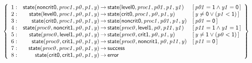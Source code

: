 \documentclass[a4paper]{article}
\def\lthtmlcheckvsize{\ifdim\ht\sizebox<\vsize 
  \ifdim\wd\sizebox<\hsize\expandafter\hfill\fi \expandafter\vfill
  \else\expandafter\vss\fi}%
\begin{document}
{\newpage\clearpage
{}%
$\displaystyle \left\{
\begin{array}{rr@{\>}c@{\>}ll}
\mathrm{1} : 
 & \mathsf{state}(\mathsf{noncrit0},\mathit{proc1},\mathit{p0},\mathit{p1},\mathit{y})
 & \to 
 & \mathsf{state}(\mathsf{level0},\mathit{proc1},\mathit{p01},\mathit{p1},\mathit{y1})
 & [\, \mathit{p01} = \mathsf{1} \land \mathit{y1} = \mathsf{0} \,]\\
\par
\mathrm{2} : 
 & \mathsf{state}(\mathsf{level0},\mathit{proc1},\mathit{p0},\mathit{p1},\mathit{y})
 & \to 
 & \mathsf{state}(\mathsf{crit0},\mathit{proc1},\mathit{p0},\mathit{p1},\mathit{y})
 & [\, \mathit{y} \ne \mathsf{0} \lor (\mathit{p1} < \mathsf{1}) \,]\\
\par
\mathrm{3} : 
 & \mathsf{state}(\mathsf{crit0},\mathit{proc1},\mathit{p0},\mathit{p1},\mathit{y})
 & \to 
 & \mathsf{state}(\mathsf{noncrit0},\mathit{proc1},\mathit{p01},\mathit{p1},\mathit{y})
 & [\, \mathit{p01} = \mathsf{0} \,]\\
\par
\mathrm{4} : 
 & \mathsf{state}(\mathit{proc0},\mathsf{noncrit1},\mathit{p0},\mathit{p1},\mathit{y})
 & \to 
 & \mathsf{state}(\mathit{proc0},\mathsf{level1},\mathit{p0},\mathit{p11},\mathit{y1})
 & [\, \mathit{p11} = \mathsf{1} \land \mathit{y1} = \mathsf{1} \,]\\
\par
\mathrm{5} : 
 & \mathsf{state}(\mathit{proc0},\mathsf{level1},\mathit{p0},\mathit{p1},\mathit{y})
 & \to 
 & \mathsf{state}(\mathit{proc0},\mathsf{crit1},\mathit{p0},\mathit{p1},\mathit{y})
 & [\, \mathit{y} \ne \mathsf{1} \lor (\mathit{p0} < \mathsf{1}) \,]\\
\par
\mathrm{6} : 
 & \mathsf{state}(\mathit{proc0},\mathsf{crit1},\mathit{p0},\mathit{p1},\mathit{y})
 & \to 
 & \mathsf{state}(\mathit{proc0},\mathsf{noncrit1},\mathit{p0},\mathit{p11},\mathit{y})
 & [\, \mathit{p11} = \mathsf{0} \,]\\
\par
\mathrm{7} : 
 & \mathsf{state}(\mathit{proc0},\mathit{proc1},\mathit{p0},\mathit{p1},\mathit{y})
 & \to 
 & \mathsf{success}\\
\par
\mathrm{8} : 
 & \mathsf{state}(\mathsf{crit0},\mathsf{crit1},\mathit{p0},\mathit{p1},\mathit{y})
 & \to 
 & \mathsf{error}\\
\par
\end{array}
\right\}
$%
\lthtmlindisplaymathZ
\lthtmlcheckvsize\clearpage}
\end{document}

